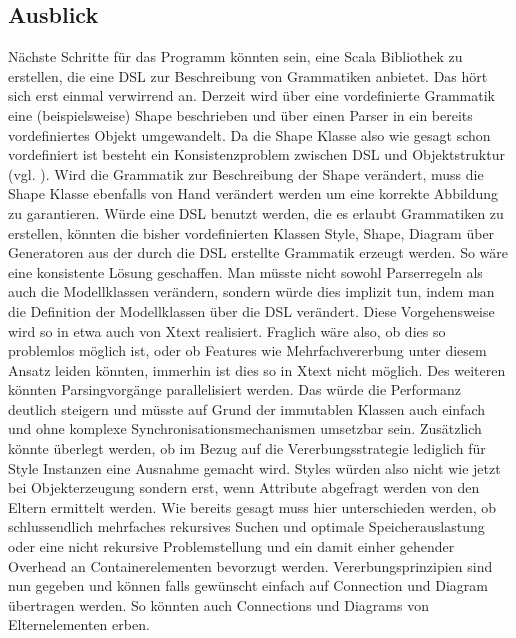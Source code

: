\subsection{Ausblick}
Nächste Schritte für das Programm könnten sein, eine Scala Bibliothek zu erstellen, die eine DSL zur Beschreibung von Grammatiken anbietet. Das hört sich erst einmal verwirrend an. Derzeit wird über eine vordefinierte Grammatik eine (beispielsweise) Shape beschrieben und über einen Parser in ein bereits vordefiniertes Objekt umgewandelt. Da die Shape Klasse also wie gesagt schon vordefiniert ist besteht ein Konsistenzproblem zwischen DSL und Objektstruktur (vgl. ). Wird die Grammatik zur Beschreibung der Shape verändert, muss die Shape Klasse ebenfalls von Hand verändert werden um eine korrekte Abbildung zu garantieren. Würde eine DSL benutzt werden, die es erlaubt Grammatiken zu erstellen, könnten die bisher vordefinierten Klassen Style, Shape, Diagram über Generatoren aus der durch die DSL erstellte Grammatik erzeugt werden. So wäre eine konsistente Lösung geschaffen. Man müsste nicht sowohl Parserregeln als auch die Modellklassen verändern, sondern würde dies implizit tun, indem man die Definition der Modellklassen über die DSL verändert. Diese Vorgehensweise wird so in etwa auch von Xtext realisiert. Fraglich wäre also, ob dies so problemlos möglich ist, oder ob Features wie Mehrfachvererbung unter diesem Ansatz leiden könnten, immerhin ist dies so in Xtext nicht möglich. Des weiteren könnten Parsingvorgänge parallelisiert werden. Das würde die Performanz deutlich steigern und müsste auf Grund der immutablen Klassen auch einfach und ohne komplexe Synchronisationsmechanismen umsetzbar sein. Zusätzlich könnte überlegt werden, ob im Bezug auf die Vererbungsstrategie lediglich für Style Instanzen eine Ausnahme gemacht wird. Styles würden also nicht wie jetzt bei Objekterzeugung sondern erst, wenn Attribute abgefragt werden von den Eltern ermittelt werden. Wie bereits gesagt muss hier unterschieden werden, ob schlussendlich mehrfaches rekursives Suchen und optimale Speicherauslastung oder eine nicht rekursive Problemstellung und ein damit einher gehender Overhead an Containerelementen bevorzugt werden. Vererbungsprinzipien sind nun gegeben und können falls gewünscht einfach auf Connection und Diagram übertragen werden. So könnten auch Connections und Diagrams von Elternelementen erben. 